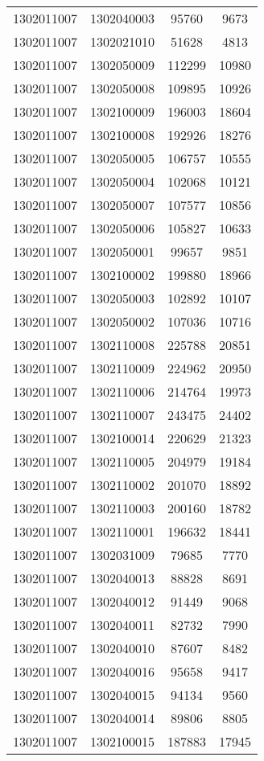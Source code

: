 \begin{longtable}{llcc}
1302011007 & 1302040003 & 95760 & 9673\\
1302011007 & 1302021010 & 51628 & 4813\\
1302011007 & 1302050009 & 112299 & 10980\\
1302011007 & 1302050008 & 109895 & 10926\\
1302011007 & 1302100009 & 196003 & 18604\\
1302011007 & 1302100008 & 192926 & 18276\\
1302011007 & 1302050005 & 106757 & 10555\\
1302011007 & 1302050004 & 102068 & 10121\\
1302011007 & 1302050007 & 107577 & 10856\\
1302011007 & 1302050006 & 105827 & 10633\\
1302011007 & 1302050001 & 99657 & 9851\\
1302011007 & 1302100002 & 199880 & 18966\\
1302011007 & 1302050003 & 102892 & 10107\\
1302011007 & 1302050002 & 107036 & 10716\\
1302011007 & 1302110008 & 225788 & 20851\\
1302011007 & 1302110009 & 224962 & 20950\\
1302011007 & 1302110006 & 214764 & 19973\\
1302011007 & 1302110007 & 243475 & 24402\\
1302011007 & 1302100014 & 220629 & 21323\\
1302011007 & 1302110005 & 204979 & 19184\\
1302011007 & 1302110002 & 201070 & 18892\\
1302011007 & 1302110003 & 200160 & 18782\\
1302011007 & 1302110001 & 196632 & 18441\\
1302011007 & 1302031009 & 79685 & 7770\\
1302011007 & 1302040013 & 88828 & 8691\\
1302011007 & 1302040012 & 91449 & 9068\\
1302011007 & 1302040011 & 82732 & 7990\\
1302011007 & 1302040010 & 87607 & 8482\\
1302011007 & 1302040016 & 95658 & 9417\\
1302011007 & 1302040015 & 94134 & 9560\\
1302011007 & 1302040014 & 89806 & 8805\\
1302011007 & 1302100015 & 187883 & 17945\\

\end{longtable}
